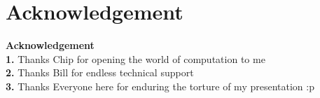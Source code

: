 \documentclass{beamer}
\begin{document}
\section{Acknowledgement}{\bf Acknowledgement}\\
\vspace{1.0cm}
\textbf{1.} Thanks Chip for opening the world of computation to me\\
\vspace{0.5cm}
\textbf{2.} Thanks Bill for endless technical support\\
\vspace{0.5cm}
\textbf{3.} Thanks Everyone here for enduring the torture of my presentation :p\\

\end{document}
